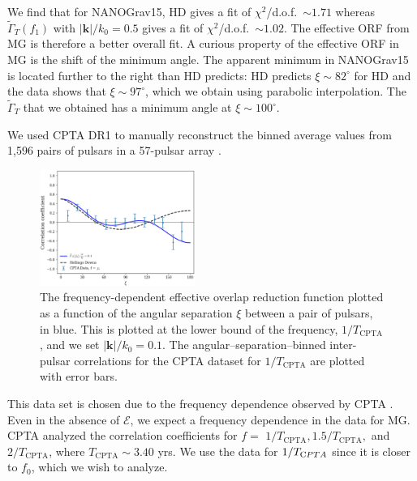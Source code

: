 \documentclass[prd,twocolumn,aps,psfig,nofootinbib,nobibnotes,superscriptaddress,preprintnumbers,times]{revtex4-2}
\begin{document}
We find that for NANOGrav15, HD gives a fit of $\chi^2$/d.o.f.\ $\sim 1.71$ whereas $\tilde{\Gamma}_T(f_1)$ with $|\boldsymbol{k}|/k_0 = 0.5$ gives a fit of $\chi^2$/d.o.f.\ $\sim 1.02$. The effective ORF from MG is therefore a better overall fit.
A curious property of the effective ORF in MG is the shift of the minimum angle. The apparent minimum in NANOGrav15 is located further to the right than HD predicts: HD predicts $\xi \sim 82^\circ$ for HD and the data shows that $\xi \sim 97^\circ$, which we obtain using parabolic interpolation. The $\tilde{\Gamma}_T$ that we obtained has a minimum angle at $\xi \sim 100^\circ$.

We used CPTA DR1 to manually reconstruct the binned average values from 1,596 pairs of pulsars in a 57-pulsar array \cite{Xu:2023wog}. 
\begin{figure}[ht]
    \centering
    \includegraphics[width=0.45\textwidth]{fig3.pdf}
    \caption{The frequency-dependent effective overlap reduction function plotted as a function of the angular separation $\xi$ between a pair of pulsars, in blue. This is plotted at the lower bound of the frequency, $1/T_{\text{CPTA}}$, and we set $|\boldsymbol{k}|/k_0 = 0.1$. The angular–separation–binned inter-pulsar correlations for the CPTA dataset for $1/T_{\text{CPTA}}$ are plotted with error bars.}
    \label{fig:cpta}
\end{figure}
This data set is chosen due to the frequency dependence observed by CPTA \cite{Xu:2023wog}. Even in the absence of $\mathcal{E}$, we expect a frequency dependence in the data for MG. CPTA analyzed the correlation coefficients for $f=$ $1/T_{\text{CPTA}}, 1.5/T_{\text{CPTA}},$ and $2/T_{\text{CPTA}}$, where $T_{\text{CPTA}} \sim 3.40$ yrs. We use the data for $1/T_{\text CPTA}$ since it is closer to $f_0$, which we wish to analyze. 
\end{document}
